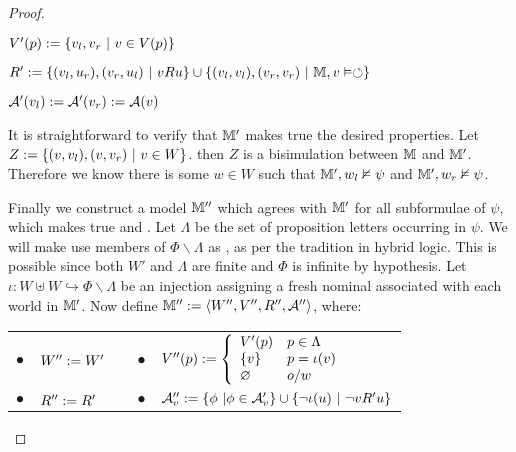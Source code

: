 \begin{proof}
\begin{itemizedot}
    \item $V' (p) \assign \{v_l, v_r \  | \  v \in V
    (p)\}$
    
    \item $R' \assign \{(v_l, u_r), (v_r, u_l) \  | \  v R
    u\} \cup \{(v_l, v_l), (v_r, v_r) \  | \  \mathbbm{M},
    v \vDash \circlearrowleft\}$
    
    \item $\mathcal{A}' (v_l) \assign \mathcal{A}' (v_r) \assign \mathcal{A}
    (v)$
  \end{itemizedot}
  
  
  It is straightforward to verify that $\mathbbm{M}'$ makes true the desired
  properties.  Let $Z \assign \{(v, v_l), (v, v_r) \  |
  \  v \in W\}$.  then $Z$ is a bisimulation between $\mathbbm{M}$
  and $\mathbbm{M}'$.  Therefore we know there is some $w \in W$ such that
  $\mathbbm{M}', w_l \nvDash \psi$ and $\mathbbm{M}', w_r \nvDash \psi$.
  
  
  
  Finally we construct a model $\mathbbm{M}''$ which agrees with
  $\mathbbm{M}'$ for all subformulae of $\psi$, which makes true
   and .  Let $\Lambda$ be the set of proposition
  letters occurring in $\psi$.  We will make use members of $\Phi \backslash
  \Lambda$ as {}, as per the tradition in hybrid logic.  This
  is possible since both $W'$ and $\Lambda$ are finite and $\Phi$ is infinite
  by hypothesis.  Let $\iota : W \uplus W \hookrightarrow \Phi \backslash
  \Lambda$ be an injection assigning a fresh nominal associated with each
  world in $\mathbbm{M}'$.  Now define $\mathbbm{M}'' \assign \langle W'',
  V'', R'', \mathcal{A}'' \rangle$, where:
  
  
  
  \begin{center}
    \begin{tabular}{lllll}
      $\bullet$ & $W'' \assign W'$ &  & $\bullet$ & $V'' (p) \assign \left\{
      \begin{array}{ll}
        V' (p) & p \in \Lambda\\
        \{v\} & p = \iota (v)\\
        \varnothing & o / w
      \end{array} \right.$\\
      $\bullet$ & $R'' \assign R'$ & {\hspace{3em}} & $\bullet$ &
      $\mathcal{A}''_v \assign \{\phi \  | \phi \in \mathcal{A}'_v
      \} \cup \{\neg \iota (u) \  | \  \neg v R' u\}$
    \end{tabular}
  \end{center}
  

\end{proof}
